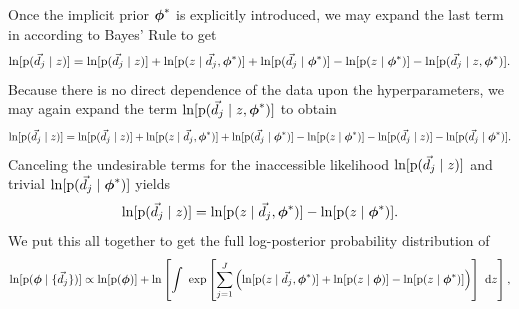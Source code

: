 Once the implicit prior ${\boldsymbol{\phi}}^{*}$ is explicitly introduced, we may expand the last term in  according to Bayes' Rule to get 
\begin{equation}
\eqlabel{eq:expand}
\ln[\pr{\data_{j} \gvn z}] = \ln[\pr{\data_{j} \gvn z}] + \ln[\pr{z \gvn \data_{j}, \ndphi^{*}}] + \ln[\pr{\data_{j} \gvn \ndphi^{*}}] - \ln[\pr{z \gvn \ndphi^{*}}] - \ln[\pr{\data_{j} \gvn z, \ndphi^{*}}].
\end{equation}
Because there is no direct dependence of the data upon the hyperparameters, we may again expand the term $\ln[\mathrm{p}(\vec{d}_{j} \mid z, {\boldsymbol{\phi}}^{*})]$ to obtain 
\begin{equation}
\eqlabel{eq:indterm}
\ln[\pr{\vec{d}_{j} \gvn z}] = \ln[\pr{\data_{j} \gvn z}] + \ln[\pr{z \gvn \data_{j}, \ndphi^{*}}] + \ln[\pr{\data_{j} \gvn \ndphi^{*}}] - \ln[\pr{z \gvn \ndphi^{*}}] - \ln[\pr{\data_{j} \gvn z}] - \ln[\pr{\data_{j} \gvn \ndphi^{*}}].
\end{equation}
Canceling the undesirable terms for the inaccessible likelihood $\ln[\mathrm{p}(\vec{d}_{j} \mid z)]$ and trivial $\ln[\mathrm{p}(\vec{d}_{j} \mid {\ensuremath{\boldsymbol{\phi}}}^{*})]$ yields
\begin{equation}
\eqlabel{eq:cancel}
\ln[\pr{\data_{j} \gvn z}] = \ln[\pr{z \gvn \data_{j}, \ndphi^{*}}]  - \ln[\pr{z \gvn \ndphi^{*}}].
\end{equation}
We put this all together to get the full log-posterior probability distribution of 
\begin{equation}
\eqlabel{eq:final}
\ln[\pr{\ndphi \gvn \{\data_{j}\}}] \propto \ln[\pr{\ndphi}] + \ln \left[\integral{\exp \left[\sum_{j=1}^{J} \left(\ln[\pr{z \gvn \data_{j}, \ndphi^{*}}] + \ln[\pr{z \gvn \ndphi}] - \ln[\pr{z \gvn \ndphi^{*}}]\right)\right]}{z}\right] ,
\end{equation}

